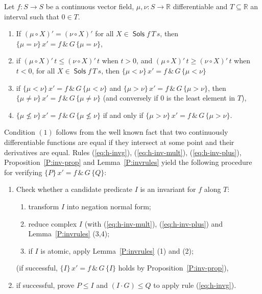 \documentclass[envcountsame,envcountsect]{llncs}
\newcommand{\reals}{\mathbb{R}}
\newcommand{\Sols}{\mathop{\mathsf{Sols}}}
\begin{document}
\begin{lemma}\label{P:invrules}
  Let $f:S\to S$ be a continuous vector field, $\mu,\nu:S\to\reals$
  differentiable and $T\subseteq \reals$ an interval such that $0\in T$.%
\begin{enumerate}
\item If $(\mu\circ X)' =(\nu\circ X)'$ for all
  $X\in \Sols f\, T\, s$, then $\{\mu=\nu\}\, x' = f\, \&\, G\, \{\mu=\nu\}$, 
\item if $(\mu\circ X)'\, t\leq(\nu\circ X)'\, t$ when $t> 0$, and
  $(\mu\circ X)'\, t\geq(\nu\circ X)'\, t$ when $t< 0$, for all
  $X\in \Sols f\, T\, s$, then
  $\{\mu <\nu\}\, x' = f\, \&\, G\, \{\mu <\nu\}$
\item if $\{\mu <\nu\}\, x' = f\, \&\, G\, \{\mu <\nu\}$ and
  $\{\mu >\nu\}\, x' = f\, \&\, G\, \{\mu >\nu\}$, then
  $\{\mu\neq \nu\}\, x' = f\, \&\, G\, \{\mu\neq \nu\}$ (and conversely if $0$ is the least element in $T$),
\item $\{\mu\not\le \nu\}\, x' = f\, \&\, G\, \{\mu\not\le \nu\}$ if and only if $\{\mu >\nu\}\, x' = f\, \&\, G\, \{\mu >\nu\}$.
\end{enumerate}
\end{lemma}

Condition $(1)$ follows from the well known fact that two continuously
differentiable functions are equal if they intersect at some point and
their derivatives are equal. Rules (\ref{eq:h-invg}),
(\ref{eq:h-inv-mult}), (\ref{eq:h-inv-plus}),
Proposition~\ref{P:inv-prop} and Lemma~\ref{P:invrules} yield the
following procedure for verifying $\{P\}\, x' = f\, \&\, G\, \{Q\}$:
\begin{enumerate}
\item Check whether a candidate predicate $I$ is an invariant for $f$
  along $T$:
	\begin{enumerate}
	\item transform $I$ into negation normal form;
	\item reduce complex $I$ (with (\ref{eq:h-inv-mult}), (\ref{eq:h-inv-plus}) and Lemma~\ref{P:invrules} (3,4);
	\item if $I$ is atomic, apply Lemma~\ref{P:invrules} (1) and (2);
	\end{enumerate}
(if successful,  $\{I\}\, x' = f\, \&\, G\, \{I\}$ holds by Proposition~\ref{P:inv-prop}),
\item if successful, prove $P\le I$ and $(I\cdot G)\le Q$ to apply rule (\ref{eq:h-invg}).
\end{enumerate}
\end{document}
